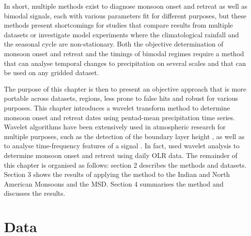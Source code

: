 In short, multiple methods exist to diagnose monsoon onset and retreat as well as bimodal signals, each with various parameters fit for different purposes, but these methods present shortcomings for studies that compare results from multiple datasets or investigate model experiments where the climatological rainfall and the seasonal cycle are non-stationary.
Both the objective determination of monsoon onset and retreat and the timings of bimodal regimes require a method that can analyse temporal changes to precipitation on several scales and that can be used on any gridded dataset. 



  The purpose of this chapter is then to present an objective approach that is more portable across datasets, regions, less prone to false hits and robust for various purposes.
This chapter introduces a wavelet transform method to determine monsoon onset and retreat dates using pentad-mean precipitation time series.  Wavelet algorithms have been extensively used in atmospheric research for multiple purposes, such as the detection of the boundary layer height \citep[e.g.][]{brooks2003}, as well as to analyse time-frequency features of a signal \citep[e.g.][]{whitcher2000,dimdore2021}. In fact, \cite{allen2017} used wavelet analysis to determine monsoon onset and retreat using daily OLR data. The remainder of this chapter is organised as follows: section 2 describes the methods and datasets. Section 3 shows the results of applying the method to the Indian and North American Monsoons and the MSD. Section 4 summarises the method and discusses the results.



\section{Data}

